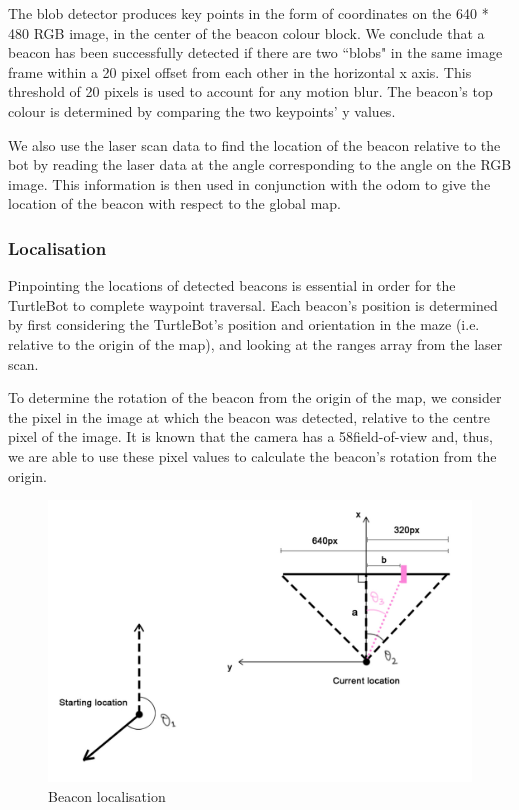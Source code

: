 \documentclass[titlepage,12pt,a4paper]{article}
\begin{document}
The blob detector produces key points in the form of coordinates on the 640 * 480 RGB image, in the center of the beacon colour block. We conclude that a beacon has been successfully detected if there are two ``blobs" in the same image frame within a 20 pixel offset from each other in the horizontal x axis. This threshold of 20 pixels is used to account for any motion blur. The beacon's top colour is determined by comparing the two keypoints' y values.

We also use the laser scan data to find the location of the beacon relative to the bot by reading the laser data at the angle corresponding to the angle on the RGB image. This information is then used in conjunction with the odom to give the location of the beacon with respect to the global map. 

\subsubsection{Localisation}
Pinpointing the locations of detected beacons is essential in order for the TurtleBot to complete waypoint traversal. Each beacon's position is determined by first considering the TurtleBot's position and orientation in the maze (i.e. relative to the origin of the map), and looking at the ranges array from the laser scan. 

To determine the rotation of the beacon from the origin of the map, we consider the pixel in the image at which the beacon was detected, relative to the centre pixel of the image. It is known that the camera has a 58\degree field-of-view and, thus, we are able to use these pixel values to calculate the beacon's rotation from the origin. 

\begin{figure}[h]
	\includegraphics[scale=0.3]{beacon.jpg}
	\caption{Beacon localisation}
\end{figure}
\end{document}

